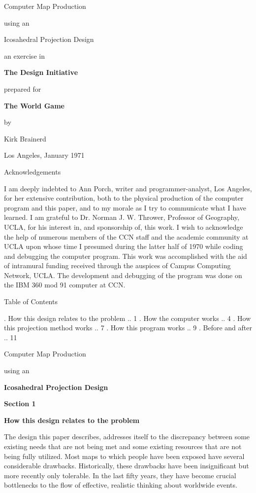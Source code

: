 
\nopagenumbers
\pageheight{8 in}
\pagewidth{5.5 in}
\hcorrection{+.5 in}
\scalefont \bf {} \andcallit \bighead
\centerline{\bighead Computer Map Production}
\bigskip\centerline{\bighead using an}
\bigskip\centerline{\bighead Icosahedral Projection Design}
\bigskip\bigskip
\centerline{an exercise in}
\centerline{\bf The Design Initiative}
\bigskip\centerline{prepared for}
\bigskip\centerline{\bf The World Game}
\bigskip\bigskip\centerline{by}
\medskip\centerline{Kirk Brainerd}
\medskip\centerline{Los Angeles, January 1971}
\vfill\eject
\centerline{Acknowledgements}
\bigskip\bigskip\flushpar
I am deeply indebted to Ann Porch, writer and programmer-analyst, Los Angeles,
for her extensive contribution,
both to the physical production of the computer program and this paper,
and to my morale as I try to communicate what I have learned.
\bigskip\flushpar
I am grateful to Dr. Norman J. W. Thrower, Professor of Geography, UCLA,
for his interest in, and sponsorship of, this work.
\bigskip\flushpar
I wish to acknowledge the help of numerous members of the CCN staff
and the academic community at UCLA
upon whose time I presumed during the latter half of 1970
while coding and debugging the computer program.
\bigskip\flushpar
This work was accomplished with the aid of intramural funding
received through the auspices of Campus Computing Network, UCLA.
The development and debugging of the program
was done on the IBM 360 mod 91 computer at CCN.
\vfill\eject
\centerline{\bighead Table of Contents}
\bigskip\bigskip
\bigskip{}. How this design relates to the problem .. 1
\bigskip{}. How the computer works .. 4
\bigskip{}. How this projection method works .. 7
\bigskip{}. How this program works .. 9
\bigskip{}. Before and after .. 11
\vfill\eject
\centerline{\bighead Computer Map Production}
\bigskip\centerline{using an}
\bigskip\centerline{\bf Icosahedral Projection Design}
\bigskip\bigskip\centerline{\bf Section 1}
\medskip\centerline{\bf How this design relates to the problem}
\bigskip\bigskip\flushpar
The design this paper describes, addresses itself
to the discrepancy between some existing needs that are
not being met and some existing resources that are not
being fully utilized.
\bigskip\flushpar
Most maps to which people have been exposed have
several considerable drawbacks.  Historically, these
drawbacks have been insignificant but more recently
only tolerable.  In the last fifty years, they have
become crucial bottlenecks to the flow of effective,
realistic thinking about worldwide events.
